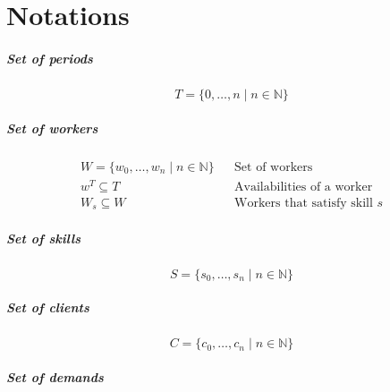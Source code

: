 \documentclass[../../thesis.tex]{subfiles}
\begin{document}
\chapter{Notations}
\label{appendix:notations}


\paragraph{Set of periods}
\begin{equation*}
  T = \{ 0, \dots, n \mid n \in \mathbb{N} \}
\end{equation*}


\paragraph{Set of workers}

\begin{align*}
  W = \{ w_0, \dots, w_n \mid n \in \mathbb{N} \} && \text{Set of workers} \\
  w^T \subseteq T && \text{Availabilities of a worker} \\ 
  W_s \subseteq W && \text{Workers that satisfy skill $s$}
\end{align*} 

\paragraph{Set of skills}

\begin{equation*}
  S = \{ s_0, \dots, s_n \mid n \in \mathbb{N} \}
\end{equation*}

\paragraph{Set of clients}

\begin{equation*}
    C = \{ c_0, \dots, c_n \mid n \in \mathbb{N} \}
\end{equation*}

\paragraph{Set of demands}
\end{document}
